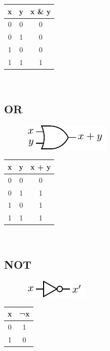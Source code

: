 \begin{tabular}{c c c}
	\hline
	\textbf{x} & \textbf{y} & \textbf{x \& y} \\ 
	\hline
	0 & 0 & 0 \\
	0 & 1 & 0 \\
	1 & 0 & 0 \\
	1 & 1 & 1 \\
	\hline 
\end{tabular} \\

\subsection{OR}

\begin{figure}[h!]
	\includegraphics{./img/or.png}
\end{figure}


\begin{tabular}{c c c}
	\hline
	\textbf{x} & \textbf{y} & \textbf{x + y} \\ 
	\hline
	0 & 0 & 0 \\
	0 & 1 & 1 \\
	1 & 0 & 1 \\
	1 & 1 & 1 \\
	\hline 
\end{tabular} \\

\subsection{NOT}

\begin{figure}[h!]
	\includegraphics{./img/not.png}
\end{figure}


\begin{tabular}{c c}
	\hline
	\textbf{x} & \textbf{¬x} \\ 
	\hline
	0 & 1  \\
	1 & 0  \\
	\hline 
\end{tabular} \\

